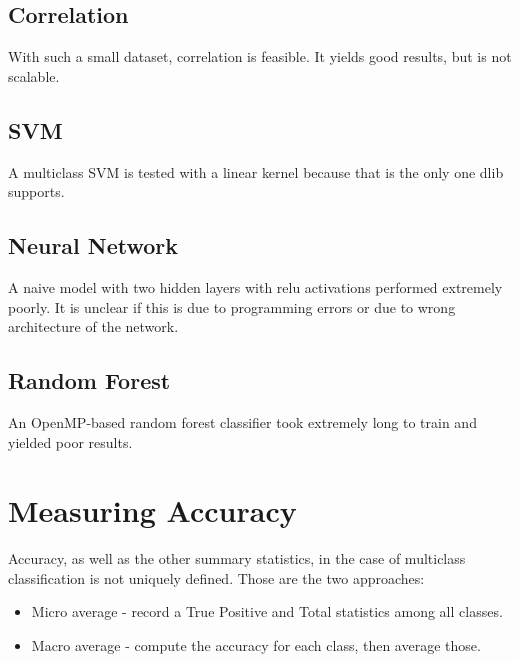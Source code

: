 \documentclass{article}
\begin{document}
\subsection{Correlation}
With such a small dataset, correlation is feasible.
It yields good results, but is not scalable.


\subsection{SVM}
A multiclass SVM is tested with a linear kernel because that is the only one dlib\cite{dlib} supports.



\subsection{Neural Network}
A naive model with two hidden layers with relu activations performed extremely poorly.
It is unclear if this is due to programming errors or due to wrong architecture of the network.


\subsection{Random Forest}
An OpenMP-based random forest classifier took extremely long to train and yielded poor results.


\section{Measuring Accuracy}
Accuracy, as well as the other summary statistics, in the case of multiclass classification is not uniquely defined.
Those are the two approaches:
\begin{itemize}
\item{Micro average - record a True Positive and Total statistics among all classes. }
\item{Macro average - compute the accuracy for each class, then average those.}
\end{itemize}
\end{document}
